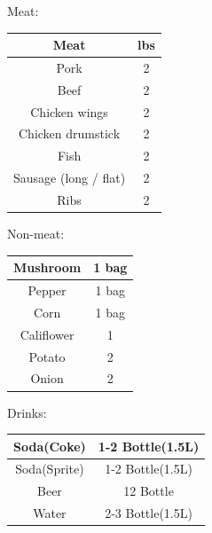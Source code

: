\documentclass[12pt]{article}
\begin{document}
	
	Meat:
	\\
	\begin{center}
	\begin{tabular}{|c|c|}
		\hline
		        Meat          & lbs \\ \hline
		        Pork          &  2  \\ \hline
		        Beef          &  2  \\ \hline
		    Chicken wings     &  2  \\ \hline
		  Chicken drumstick   &  2  \\ \hline
			 Fish	&  2  \\ \hline
		Sausage (long / flat) &  2  \\ \hline
		        Ribs          &  2  \\ \hline
	\end{tabular} 
		\end{center}
	
	Non-meat:
	
	\begin{center}
	\begin{tabular}{|c|c|}
		\hline
		 Mushroom  & 1 bag \\ \hline
		  Pepper   & 1 bag \\ \hline
		   Corn    & 1 bag \\ \hline
		Califlower &   1   \\ \hline
		  Potato   &   2   \\ \hline
		  Onion    &   2   \\ \hline
	\end{tabular} 	
	\end{center}
	
	Drinks: 
	
	\begin{center}
		\begin{tabular}{|c|c|}
			\hline
			 Soda(Coke)  & 1-2 Bottle(1.5L) \\ \hline
			Soda(Sprite) & 1-2 Bottle(1.5L) \\ \hline
			    Beer     &    12 Bottle     \\ \hline
			   Water     & 2-3 Bottle(1.5L) \\ \hline
		\end{tabular} 	
	\end{center}	
	
	
\end{document}
